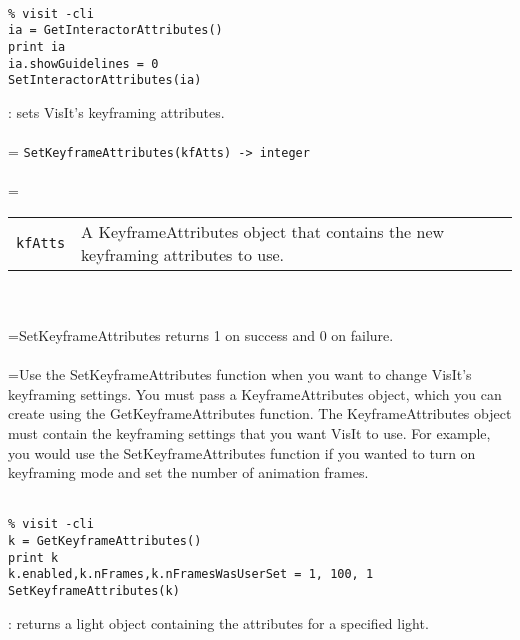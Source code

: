 \documentclass[10pt,a4paper]{report}
\begin{document}
\\[-6mm]
\begin{verbatim}% visit -cli
ia = GetInteractorAttributes()
print ia
ia.showGuidelines = 0
SetInteractorAttributes(ia)
\end{verbatim}
\newpage


{}
: sets VisIt's keyframing attributes.\\[-3mm]

 \\ 
\hangindent=\parindent 
\verb!SetKeyframeAttributes(kfAtts) -> integer!\\ [-3mm]

 \\ 
\hangindent=\parindent 
\begin{tabular}{lp{9cm}}
\verb!kfAtts! & A KeyframeAttributes object that contains the new keyframing attributes to use. \\
\end{tabular} \\[-2mm]


 \\ 
\hangindent=\parindent SetKeyframeAttributes returns 1 on success and 0 on failure. \\[-3mm] 

 \\ 
\hangindent=\parindent Use the SetKeyframeAttributes function when you want to change VisIt's keyframing settings. You must pass a KeyframeAttributes object, which you can create using the GetKeyframeAttributes function. The KeyframeAttributes object must contain the keyframing settings that you want VisIt to use. For example, you would use the SetKeyframeAttributes function if you wanted to turn on keyframing mode and set the number of animation frames. \\[-3mm] 

\\[-6mm]
\begin{verbatim}% visit -cli
k = GetKeyframeAttributes()
print k
k.enabled,k.nFrames,k.nFramesWasUserSet = 1, 100, 1
SetKeyframeAttributes(k)
\end{verbatim}
\newpage


{}
: returns a light object containing the attributes for a specified light.\\[-3mm]
\end{document}
